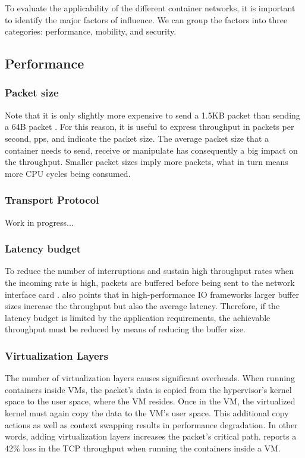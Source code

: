 \documentclass[conference]{IEEEtran}
\begin{document}
To evaluate the applicability of the different container networks, it is important to identify the major factors of influence. We can group the factors into three categories: performance, mobility, and security.

\subsection{Performance}

\subsubsection{Packet size}
Note that it is only slightly more expensive to send a 1.5KB packet than sending a 64B packet \cite{Rizzo:2012}. For this reason, it is useful to express throughput in packets per second, pps, and indicate the packet size. The average packet size that a container needs to send, receive or manipulate has consequently a big impact on the throughput. Smaller packet sizes imply more packets, what in turn means more CPU cycles being consumed.

\subsubsection{Transport Protocol}
Work in progress...

\subsubsection{Latency budget}
To reduce the number of interruptions and sustain high throughput rates when the incoming rate is high,  packets are buffered before being sent to the network interface card \cite{DEBS_20:Stylianopoulos}. \cite{ANCS:Gallenmüller} also points that in high-performance IO frameworks larger buffer sizes increase the throughput but also the average latency. Therefore, if the latency budget is limited by the application requirements, the achievable throughput must be reduced by means of reducing the buffer size.
\subsubsection{Virtualization Layers}
The number of virtualization layers causes significant overheads. When running containers inside VMs, the packet's data is copied from the hypervisor's kernel space to the user space, where the VM resides. Once in the VM, the virtualized kernel must again copy the data to the VM’s user space. This additional copy actions as well as context swapping results in performance degradation. In other words, adding virtualization layers increases the packet's critical path. \cite{IEEE_INFOCOM_2018:K. Suo} reports a 42\% loss in the TCP throughput when running the containers inside a VM.
\end{document}
